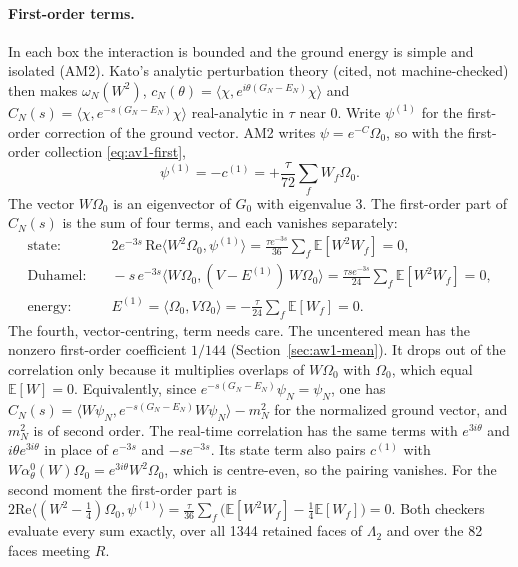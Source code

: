 \paragraph{First-order terms.}
In each box the interaction is bounded and the ground energy is simple and
isolated (AM2). Kato's analytic perturbation theory (cited, not
machine-checked) then makes $\omega_N(W^2)$,
$c_N(\theta)=\langle\chi,e^{i\theta(G_N-E_N)}\chi\rangle$ and
$C_N(s)=\langle\chi,e^{-s(G_N-E_N)}\chi\rangle$ real-analytic in $\tau$ near
$0$. Write $\psi^{(1)}$ for the first-order correction of the ground vector.
AM2 writes $\psi=e^{-C}\Omega_0$, so with the first-order collection
\eqref{eq:av1-first},
\begin{equation}
 \psi^{(1)}=-c^{(1)}=+\frac{\tau}{72}\sum_fW_f\Omega_0 .
 \label{eq:aw1-psi1}
\end{equation}
The vector $W\Omega_0$ is an eigenvector of $G_0$ with eigenvalue $3$. The
first-order part of $C_N(s)$ is the sum of four terms, and each vanishes
separately:
\begin{equation}
 \begin{aligned}
 \text{state:}&\quad 2e^{-3s}\,\mathrm{Re}\langle W^2\Omega_0,\psi^{(1)}\rangle
 =\frac{\tau e^{-3s}}{36}\sum_f\mathbb E[W^2W_f]=0,\\
 \text{Duhamel:}&\quad -s\,e^{-3s}\langle W\Omega_0,(V-E^{(1)})\,W\Omega_0\rangle
 =\frac{\tau s e^{-3s}}{24}\sum_f\mathbb E[W^2W_f]=0,\\
 \text{energy:}&\quad E^{(1)}=\langle\Omega_0,V\Omega_0\rangle
 =-\frac{\tau}{24}\sum_f\mathbb E[W_f]=0 .
 \end{aligned}
 \label{eq:aw1-terms}
\end{equation}
The fourth, vector-centring, term needs care. The uncentered mean has the
nonzero first-order coefficient $1/144$ (Section~\ref{sec:aw1-mean}). It drops
out of the correlation only because it multiplies overlaps of $W\Omega_0$ with
$\Omega_0$, which equal $\mathbb E[W]=0$. Equivalently, since
$e^{-s(G_N-E_N)}\psi_N=\psi_N$, one has
$C_N(s)=\langle W\psi_N,e^{-s(G_N-E_N)}W\psi_N\rangle-m_N^2$ for the normalized
ground vector, and $m_N^2$ is of second order. The real-time correlation has
the same terms with $e^{3i\theta}$ and $i\theta e^{3i\theta}$ in place of
$e^{-3s}$ and $-se^{-3s}$. Its state term also pairs $c^{(1)}$ with
$W\alpha^0_\theta(W)\Omega_0=e^{3i\theta}W^2\Omega_0$, which is centre-even,
so the pairing vanishes. For the second moment the first-order part is
$2\mathrm{Re}\langle(W^2-\tfrac14)\Omega_0,\psi^{(1)}\rangle
=\tfrac{\tau}{36}\sum_f\bigl(\mathbb E[W^2W_f]-\tfrac14\mathbb E[W_f]\bigr)=0$.
Both checkers evaluate every sum exactly, over all 1344 retained faces of
$\Lambda_2$ and over the 82 faces meeting $R$.

